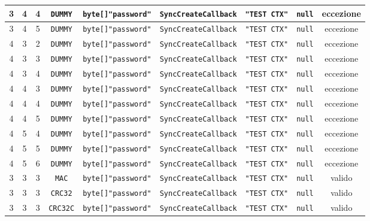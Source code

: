\documentclass[10pt]{article}
\begin{document}
{\begin{table}[h]
{\begin{tabular}{|c|c|c|c|c|c|c|c|c|}
					\hline
					3 & 4 & 4 & \texttt{DUMMY} & \texttt{byte[]{"password"}} & \texttt{SyncCreateCallback} & \texttt{"TEST CTX"} & \texttt{null} & eccezione \\
					\hline
					3 & 4 & 5 & \texttt{DUMMY} & \texttt{byte[]{"password"}} & \texttt{SyncCreateCallback} & \texttt{"TEST CTX"} & \texttt{null} & eccezione \\
					\hline
					4 & 3 & 2 & \texttt{DUMMY} & \texttt{byte[]{"password"}} & \texttt{SyncCreateCallback} & \texttt{"TEST CTX"} & \texttt{null} & eccezione \\
					\hline
					4 & 3 & 3 & \texttt{DUMMY} & \texttt{byte[]{"password"}} & \texttt{SyncCreateCallback} & \texttt{"TEST CTX"} & \texttt{null} & eccezione \\
					\hline
					4 & 3 & 4 & \texttt{DUMMY} & \texttt{byte[]{"password"}} & \texttt{SyncCreateCallback} & \texttt{"TEST CTX"} & \texttt{null} & eccezione \\
					\hline
					4 & 4 & 3 & \texttt{DUMMY} & \texttt{byte[]{"password"}} & \texttt{SyncCreateCallback} & \texttt{"TEST CTX"} & \texttt{null} & eccezione \\
					\hline
					4 & 4 & 4 & \texttt{DUMMY} & \texttt{byte[]{"password"}} & \texttt{SyncCreateCallback} & \texttt{"TEST CTX"} & \texttt{null} & eccezione \\
					\hline
					4 & 4 & 5 & \texttt{DUMMY} & \texttt{byte[]{"password"}} & \texttt{SyncCreateCallback} & \texttt{"TEST CTX"} & \texttt{null} & eccezione \\
					\hline
					4 & 5 & 4 & \texttt{DUMMY} & \texttt{byte[]{"password"}} & \texttt{SyncCreateCallback} & \texttt{"TEST CTX"} & \texttt{null} & eccezione \\
					\hline
					4 & 5 & 5 & \texttt{DUMMY} & \texttt{byte[]{"password"}} & \texttt{SyncCreateCallback} & \texttt{"TEST CTX"} & \texttt{null} & eccezione \\
					\hline
					4 & 5 & 6 & \texttt{DUMMY} & \texttt{byte[]{"password"}} & \texttt{SyncCreateCallback} & \texttt{"TEST CTX"} & \texttt{null} & eccezione \\
					\hline
					3 & 3 & 3 & \texttt{MAC} & \texttt{byte[]{"password"}} & \texttt{SyncCreateCallback} & \texttt{"TEST CTX"} & \texttt{null} & valido \\
					\hline
					3 & 3 & 3 & \texttt{CRC32} & \texttt{byte[]{"password"}} & \texttt{SyncCreateCallback} & \texttt{"TEST CTX"} & \texttt{null} & valido \\
					\hline
					3 & 3 & 3 & \texttt{CRC32C} & \texttt{byte[]{"password"}} & \texttt{SyncCreateCallback} & \texttt{"TEST CTX"} & \texttt{null} & valido \\

\end{tabular}}
\end{table}}
\end{document}
